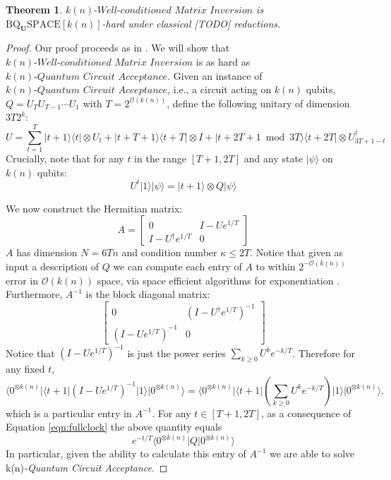 \documentclass[11pt]{article}
\newtheorem{theorem}{Theorem}
\theoremstyle{definition}
\theoremstyle{remark}
\newcommand\matrixinvert[1]{{\ensuremath{#1}}\textit{-Well-conditioned Matrix Inversion}}
\newcommand\qca[1]{#1\textit{-Quantum Circuit Acceptance}}
\newcommand{\zero}{\ensuremath{0^{\otimes{k(n)}}}}
\newcommand{\classfont}{\mathrm}
\newcommand{\Unitary}{\mathbf{U}}
\newcommand{\unitaryBQSPACE}[1]{\classfont{BQ}_\Unitary\classfont{SPACE}[#1]}
\begin{document}
\begin{theorem}
$\matrixinvert{k(n)}$ is $\unitaryBQSPACE{k(n)}$-hard under classical [TODO] reductions.	
\end{theorem}
\begin{proof}
Our proof proceeds as in \cite{HHL}.  We will show that $\matrixinvert{k(n)}$ is as hard as $\qca{k(n)}$.  Given an instance of $\qca{k(n)}$, i.e., a circuit acting on $k(n)$ qubits, $Q=U_TU_{T-1}\cdots U_1$ with $T = 2^{\mathcal{O}(k(n))}$, define the following unitary of dimension $3T2^k$:
\[U=\sum_{t=1}^{T}|t+1\rangle\langle t|\otimes U_t+|t+T+1\rangle\langle t+T|\otimes I+|t+2T+1\bmod{3T}\rangle\langle t+2T|\otimes U_{3T+1-t}^{\dagger}\]	
Crucially, note that for any $t$ in the range $[T+1,2T]$ and any state $|\psi\rangle$ on $k(n)$ qubits: 
\begin{equation}\label{eqn:fullclock}
	U^t|1\rangle|\psi\rangle=|t+1\rangle\otimes Q|\psi\rangle
\end{equation}

We now construct the Hermitian matrix:
\begin{equation}
A=\begin{bmatrix}
    0 & I-Ue^{1/T}\\
   I-U^{\dagger}e^{1/T} &  0
\end{bmatrix}
\end{equation}
 $A$ has dimension $N=6Tn$ and condition number $\kappa\leq 2T$.  Notice that given as input a description of $Q$ we can compute each entry of $A$ to within $2^{-\mathcal{O}(k(n))}$ error in $\mathcal{O}(k(n))$ space, via space efficient algorithms for exponentiation \cite{reif}.
   Furthermore, $A^{-1}$ is the block diagonal matrix:
\begin{equation}
\begin{bmatrix}
    0 & \left(I-U^\dagger e^{1/T}\right)^{-1}\\
   \left(I-Ue^{1/T}\right)^{-1} &  0
\end{bmatrix}
\end{equation}
 Notice that $\left(I-Ue^{1/T}\right)^{-1}$ is just the power series $\sum_{k\geq 0}U^k e^{-k/T}$. Therefore for any fixed $t$,
 \begin{equation}
\langle\zero|\langle t+1|\left(I-Ue^{1/T}\right)^{-1}|1\rangle|\zero\rangle=\langle\zero|\langle t+1|\left(\sum_{k\geq 0}U^k e^{-k/T}\right)|1\rangle|\zero\rangle,
\end{equation}
which is a particular entry in $A^{-1}$. For any $t \in [T+1,2T]$, as a consequence of Equation \ref{eqn:fullclock} the above quantity equals
\begin{equation}
e^{-t/T}\langle\zero|Q|\zero\rangle
\end{equation}
In particular, given the ability to calculate this entry of $A^{-1}$ we are able to solve \qca{k(n)}.
\end{proof}
\end{document}
